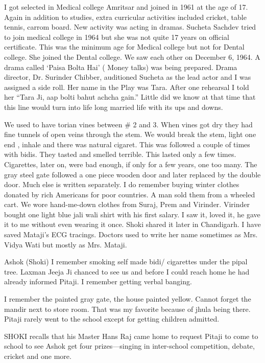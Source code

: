 I got selected in Medical college Amritsar and joined in 1961 at the age of 17. Again in addition to studies, extra curricular activities included cricket, table tennis, carrom board. New activity was acting in dramas. Sucheta Sachdev tried to join medical college in 1964 but she was not quite 17 years on official certificate. This was the minimum age for Medical college but not for Dental college. She joined the Dental college. We saw each other on December 6, 1964. A drama called ‘Paisa Bolta Hai’ ( Money talks) was being prepared. Drama director, Dr. Surinder Chibber, auditioned Sucheta as the lead actor and I was assigned a side roll. Her name in the Play was Tara. After one rehearsal I told her “Tara Ji, aap bolti bahut achcha gain.” Little did we know at that time that this line would turn into life long married life with its ups and downs. 


We used to have torian vines between # 2 and 3. When vines got dry they had fine tunnels of open veins through the stem. We would break the stem, light one end , inhale and there was natural cigaret. This was followed a couple of times with bidis. They tasted and smelled terrible. This lasted only a few times. Cigarettes, later on, were bad enough, if only for a few years, one too many. 
The gray steel gate followed a one piece wooden door and later replaced by the double door. Much else is written separately. 
I do remember buying winter clothes donated by rich Americans for poor countries. A man sold them from a wheeled cart. We wore hand-me-down clothes from Suraj, Prem and Virinder. Virinder bought one light blue jali wali shirt with his first salary. I saw it, loved it, he gave it to me without even wearing it once. Shoki shared it later in Chandigarh. 
I have saved Mataji’s ECG tracings. Doctors used to write her name sometimes as Mrs. Vidya Wati but mostly as Mrs. Mataji. 

Ashok (Shoki) 
I remember smoking self made bidi/ cigarettes under the pipal tree. Laxman Jeeja Ji chanced to see us and before I could reach home he had already informed Pitaji. I remember getting verbal banging. 

I remember the painted gray gate, the house painted yellow. Cannot forget the mandir next to store room. That was my favorite because of jhula being there. 
Pitaji rarely went to the school except for getting children admitted. 

SHOKI recalls that his Master Hans Raj came home to request Pitaji to come to school to see Ashok get four prizes—singing in inter-school competition, debate, cricket and one more. 

